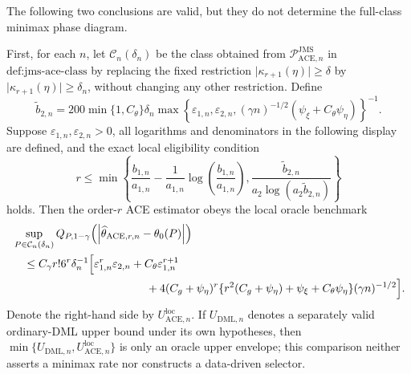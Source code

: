 The following two conclusions are valid, but they do not determine the full-class minimax phase diagram.

First, for each \(n\), let \(\mathcal C_n(\delta_n)\) be the class obtained from \(\mathcal P_{\mathrm{ACE},n}^{\mathrm{JMS}}\) in \(\text{def:jms-ace-class}\) by replacing the fixed restriction \(\lvert\kappa_{r+1}(\eta)\rvert\ge\delta\) by \(\lvert\kappa_{r+1}(\eta)\rvert\ge\delta_n\), without changing any other restriction.  Define
\[
 \widetilde b_{2,n}
 =200\min\{1,C_{\theta}\}\delta_n
 \max\!\left\{
   \varepsilon_{1,n},\varepsilon_{2,n},
   (\gamma n)^{-1/2}(\psi_{\xi}+C_{\theta}\psi_{\eta})
 \right\}^{-1}.
\]
Suppose \(\varepsilon_{1,n},\varepsilon_{2,n}>0\), all logarithms and denominators in the following display are defined, and the exact local eligibility condition
\[
 r\le
 \min\!\left\{
   \frac{b_{1,n}}{a_{1,n}}
   -\frac{1}{a_{1,n}}\log\!\left(\frac{b_{1,n}}{a_{1,n}}\right),
   \frac{\widetilde b_{2,n}}{a_2\log(a_2\widetilde b_{2,n})}
 \right\}
\]
holds.  Then the order-\(r\) ACE estimator obeys the local oracle benchmark
\[
\begin{aligned}
 &\sup_{P\in\mathcal C_n(\delta_n)}
 Q_{P,1-\gamma}
 \!\left(\left|\widehat\theta_{\mathrm{ACE},r,n}-\theta_0(P)\right|\right)\\
 &\quad\le
 C_{\gamma}r!6^r\delta_n^{-1}
 \Bigl[
   \varepsilon_{1,n}^r\varepsilon_{2,n}
   +C_{\theta}\varepsilon_{1,n}^{r+1}\\
 &\hspace{42mm}
   +4(C_g+\psi_{\eta})^r
    \{r^2(C_g+\psi_{\eta})+\psi_{\xi}+C_{\theta}\psi_{\eta}\}
    (\gamma n)^{-1/2}
 \Bigr].
\end{aligned}
\]
Denote the right-hand side by \(U_{\mathrm{ACE},n}^{\mathrm{loc}}\).  If \(U_{\mathrm{DML},n}\) denotes a separately valid ordinary-DML upper bound under its own hypotheses, then \(\min\{U_{\mathrm{DML},n},U_{\mathrm{ACE},n}^{\mathrm{loc}}\}\) is only an oracle upper envelope; this comparison neither asserts a minimax rate nor constructs a data-driven selector.

